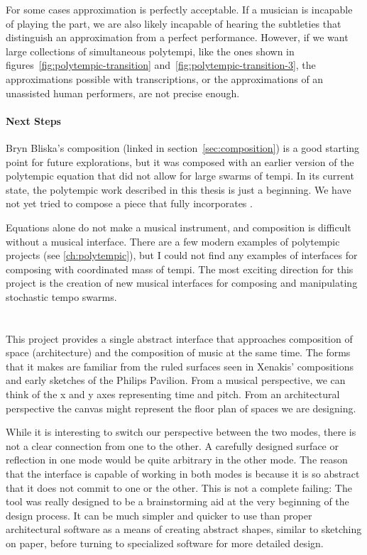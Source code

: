 For some cases approximation is perfectly acceptable. If a musician
is incapable of playing the part, we are also likely incapable of
hearing the subtleties that distinguish an approximation from a
perfect performance. However, if we want large collections of
simultaneous polytempi, like the ones shown in
figures~\ref{fig:polytempic-transition}
and~\ref{fig:polytempic-transition-3}, the approximations possible
with transcriptions, or the approximations of an unassisted human
performers, are not precise enough.

\paragraph{Next Steps} Bryn Bliska's composition (linked in
section~\ref{sec:composition}) is a good starting point for future
explorations, but it was composed with an earlier version of the
polytempic equation that did not allow for large swarms of tempi. In
its current state, the polytempic work described in this thesis is
just a beginning. We have not yet tried to compose a piece that
fully incorporates \polytempic. 

Equations alone do not make a musical instrument, and composition is
difficult without a musical interface. There are a few modern
examples of polytempic projects (see \autoref{ch:polytempic}), but I
could not find any examples of interfaces for composing with
coordinated mass of tempi. The most exciting direction for
this project is the creation of new musical interfaces for composing
and manipulating stochastic tempo swarms. 


\section{}
This project provides a single abstract interface that approaches
composition of space (architecture) and the composition of music at
the same time. The forms that it makes are familiar from the ruled
surfaces seen in Xenakis' compositions and early sketches of the
Philips Pavilion. From a musical perspective, we can think of the x
and y axes representing time and pitch. From an architectural
perspective the canvas might represent the floor plan of spaces we are
designing.

While it is interesting to switch our perspective between the two
modes, there is not a clear connection from one to the other. A
carefully designed surface or reflection in one mode would be quite
arbitrary in the other mode. The reason that the interface is capable
of working in both modes is because it is so abstract that it does
not commit to one or the other. This is not a complete failing: The
tool was really designed to be a brainstorming aid at the very
beginning of the design process. It can be much simpler and quicker to
use than proper architectural software as a means of creating
abstract shapes, similar to sketching on paper, before turning to
specialized software for more detailed design.

